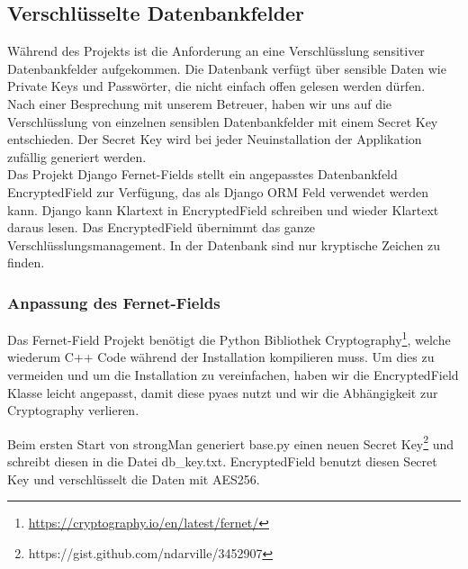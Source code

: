 \subsection{Verschlüsselte Datenbankfelder}
Während des Projekts ist die Anforderung an eine Verschlüsslung sensitiver Datenbankfelder aufgekommen. Die Datenbank verfügt über sensible Daten wie Private Keys und Passwörter, die nicht einfach offen gelesen werden dürfen.\\


Nach einer Besprechung mit unserem Betreuer, haben wir uns auf die Verschlüsslung von einzelnen sensiblen Datenbankfelder mit einem Secret Key entschieden. Der Secret Key wird bei jeder Neuinstallation der Applikation zufällig generiert werden.\\
Das Projekt  Django Fernet-Fields \cite{fernet-fields} stellt ein angepasstes Datenbankfeld EncryptedField zur Verfügung, das als Django ORM Feld verwendet werden kann. Django kann Klartext in EncryptedField schreiben und wieder Klartext daraus lesen. Das EncryptedField übernimmt das ganze Verschlüsslungsmanagement. In der Datenbank sind nur kryptische Zeichen zu finden.

\subsubsection{Anpassung des Fernet-Fields}
Das Fernet-Field Projekt benötigt die Python Bibliothek Cryptography\footnote{\url{https://cryptography.io/en/latest/fernet/}}, welche wiederum C++ Code während der Installation kompilieren muss. Um dies zu vermeiden und um die Installation zu vereinfachen, haben wir die EncryptedField Klasse leicht angepasst, damit diese pyaes  nutzt und wir die Abhängigkeit zur Cryptography verlieren.

Beim ersten Start von strongMan generiert base.py einen neuen Secret Key\footnote{https://gist.github.com/ndarville/3452907} und schreibt diesen in die Datei db\_key.txt.
EncryptedField benutzt diesen Secret Key und verschlüsselt die Daten mit AES256.